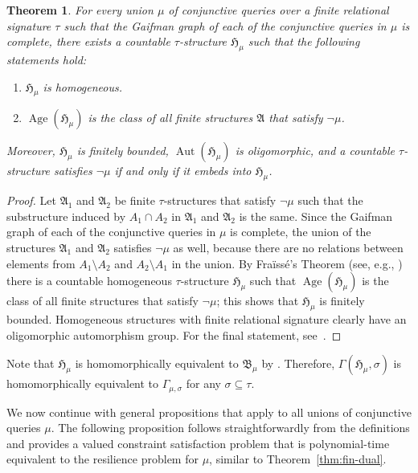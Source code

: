 \documentclass[nonacm]{acmart}
\newcommand{\bA}{{\mathfrak A}}
\newcommand{\bB}{{\mathfrak B}}
\newcommand{\bH}{{\mathfrak H}}
\DeclareMathOperator{\Aut}{Aut}
\DeclareMathOperator{\Age}{Age}
\newtheorem{theorem}{Theorem}[section]
\begin{document}
\begin{theorem}\label{thm:freeAP}
    For every union $\mu$ of %
    conjunctive queries over a finite relational signature $\tau$ such that the Gaifman graph of each of the conjunctive queries in $\mu$  is complete, there exists a countable $\tau$-structure $\bH_\mu$ such that the following statements hold:
    \begin{enumerate}
        \item $\bH_\mu$ is homogeneous.
        \item $\Age(\bH_\mu)$ is the class of all finite structures $\bA$ that satisfy $\neg \mu$.
    \end{enumerate}
    Moreover, $\bH_\mu$ is finitely bounded, $\Aut(\bH_\mu)$ is oligomorphic, and a countable $\tau$-structure satisfies $\neg \mu$ if and only if it embeds into $\bH_\mu$.
\end{theorem}
\begin{proof}
    Let $\bA_1$ and $\bA_2$ be finite $\tau$-structures that satisfy $\neg \mu$ such that the substructure induced by $A_1 \cap A_2$ in $\bA_1$ and $\bA_2$ is the same. Since the Gaifman graph of each of the conjunctive queries in $\mu$ is complete, the union of the structures $\bA_1$ and $\bA_2$ satisfies $\neg \mu$ as well, because there are no relations between elements from $A_1 \setminus A_2$ and $A_2 \setminus A_1$ in the union. By Fra\"iss\'e's Theorem (see, e.g., \cite{Hodges})
    there is a countable homogeneous $\tau$-structure $\bH_\mu$ such that $\Age(\bH_\mu)$ is the class of all finite structures that satisfy $\neg \mu$; this shows that $\bH_\mu$ is finitely bounded. 
    Homogeneous structures with finite relational signature clearly have an oligomorphic automorphism group. 
    For the final statement, see~\cite[Lemma 4.1.7]{Book}.
\end{proof}

Note that $\bH_\mu$ is homomorphically equivalent to $\bB_\mu$ by \cite[Lemma 4.1.7]{Book}. Therefore, $\Gamma(\bH_\mu, \sigma)$ is homomorphically equivalent to $\Gamma_{\mu,\sigma}$ for any $\sigma \subseteq \tau$.

We now continue with general propositions that apply to all unions of conjunctive queries $\mu$. The following proposition follows straightforwardly from the definitions and provides a valued constraint satisfaction problem that is polynomial-time equivalent to the resilience problem for $\mu$, similar to Theorem~\ref{thm:fin-dual}. 
\end{document}
